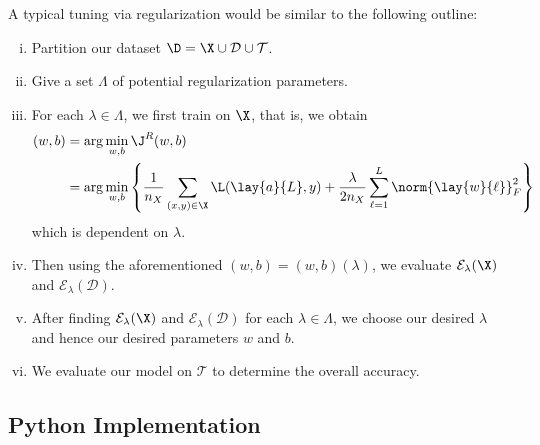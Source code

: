 A typical tuning via regularization would be similar to the following outline:
\begin{enumerate}[i.]
	\item Partition our dataset $\D=\X\cup\mathcal{D}\cup\mathcal{T}$.
	\item Give a set $\Lambda$ of potential regularization parameters.
	\item For each $\lambda\in\Lambda$, we first train on $\X$, that is, we obtain
		\begin{align*}
			(w,b)&=\arg\min_{w,b}\J^R(w,b)\\
			&=\arg\min_{w,b}\left\{\frac{1}{n_X}\sum_{(x,y)\in\X}\L(\lay{a}{L},y)+\frac{\lambda}{2n_X}\sum_{\ell=1}^L\norm{\lay{w}{\ell}}_F^2\right\}
		\end{align*}
		which is dependent on $\lambda$.
	\item Then using the aforementioned $(w,b)=(w,b)(\lambda)$, we evaluate $\mathcal{E}_\lambda(\X)$ and $\mathcal{E}_\lambda(\mathcal{D})$.
	\item After finding $\mathcal{E}_\lambda(\X)$ and $\mathcal{E}_\lambda(\mathcal{D})$ for each $\lambda\in\Lambda$, we choose our desired $\lambda$ and hence our desired parameters $w$ and $b$.
	\item We evaluate our model on $\mathcal{T}$ to determine the overall accuracy.
\end{enumerate}


\subsection{Python Implementation}



